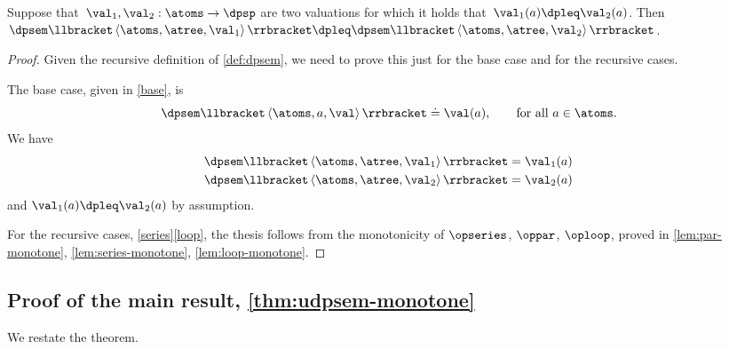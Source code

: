 \begin{lemma}
  \label{lem:dpsem-monotone}Suppose that~$\val_{1},\val_{2}:\atoms\rightarrow\dpsp$
  are two valuations for which it holds that~$\val_{1}(a)\dpleq\val_{2}(a)$.
  Then~$\dpsem\llbracket\left\langle \atoms,\atree,\val_{1}\right\rangle \rrbracket\dpleq\dpsem\llbracket\left\langle \atoms,\atree,\val_{2}\right\rangle \rrbracket$.
\end{lemma}
\begin{proof}
  Given the recursive definition of \cref{def:dpsem}, we need
  to prove this just for the base case and for the recursive cases.

  The base case, given in \eqref{base}, is
  \[
    \dpsem\llbracket\left\langle \atoms,a,\val\right\rangle \rrbracket\doteq\val(a),\qquad\text{for all}\ a\in\atoms.
  \]
  We have
  \begin{align*}
    \dpsem\llbracket\left\langle \atoms,\atree,\val_{1}\right\rangle \rrbracket & =\val_{1}(a)\\
    \dpsem\llbracket\left\langle \atoms,\atree,\val_{2}\right\rangle \rrbracket & =\val_{2}(a)
  \end{align*}
  and $\val_{1}(a)\dpleq\val_{2}(a)$ by assumption.

  For the recursive cases, \eqref{series}\textendash \eqref{loop},
  the thesis follows from the monotonicity of $\opseries$, $\oppar$,
  $\oploop$, proved in \cref{lem:par-monotone}, \cref{lem:series-monotone},
  \cref{lem:loop-monotone}.
\end{proof}

\subsection{Proof of the main result, \cref{thm:udpsem-monotone}}

\label{subsec:proof-main-result}

We restate the theorem.


